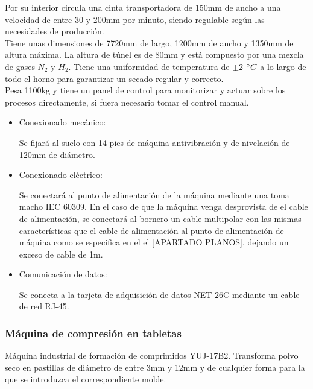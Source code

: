 	Por su interior circula una cinta transportadora de 150mm de ancho a una velocidad de entre 30 y 200mm por minuto, siendo regulable según las necesidades de producción.\\

	Tiene unas dimensiones de 7720mm de largo, 1200mm de ancho y 1350mm de altura máxima. La altura de túnel es de 80mm y está compuesto por una mezcla de gases $N_2$ y $H_2$. Tiene una uniformidad de temperatura de $\pm$2 $\degree C$ a lo largo de todo el horno para garantizar un secado regular y correcto.\\

	Pesa 1100kg y tiene un panel de control para monitorizar y actuar sobre los procesos directamente, si fuera necesario tomar el control manual.

		\begin{itemize}
				\item{Conexionado mecánico:}
				
				Se fijará al suelo con 14 pies de máquina antivibración y de nivelación de 120mm de diámetro.

				\item{Conexionado eléctrico:}

				Se conectará al punto de alimentación de la máquina mediante una  toma macho IEC 60309. En el caso de que la máquina venga desprovista de el cable de alimentación, se conectará al bornero un cable multipolar con las mismas características que el cable de alimentación al punto de alimentación de máquina como se especifica en el el [APARTADO PLANOS], dejando un exceso de cable de 1m. \
				
				\item{Comunicación de datos:}

				Se conecta a la tarjeta de adquisición de datos NET-26C mediante un cable de red RJ-45.
				
		\end{itemize}

	\newpage

	\subsubsection{Máquina de compresión en tabletas}

	

	Máquina industrial de formación de comprimidos YUJ-17B2. Transforma polvo seco en pastillas de diámetro de entre 3mm y 12mm y de cualquier forma para la que se introduzca el correspondiente molde.\\


